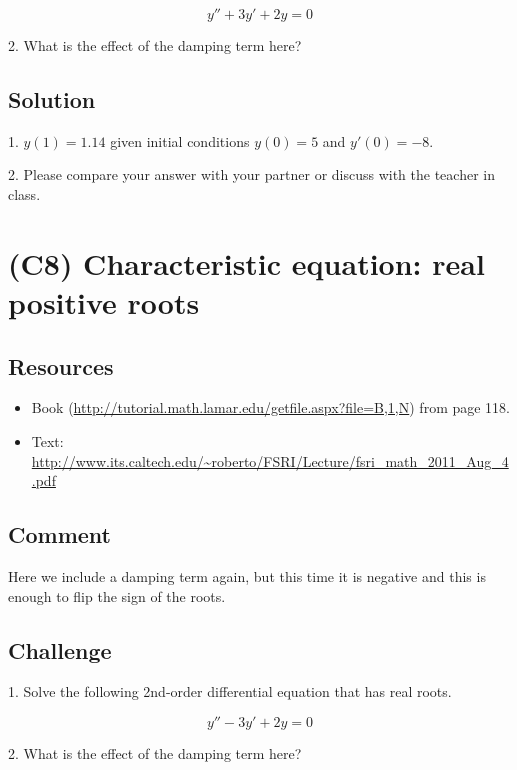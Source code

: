 \begin{equation}
    \label{eq:ccrrpb}
    y'' + 3 y' + 2 y = 0
\end{equation}

2. What is the effect of the damping term here?

\subsection*{Solution}
1. $y(1) = 1.14$ given initial conditions $y(0)=5$ and $y'(0)=-8$.

2. Please compare your answer with your partner or discuss with the teacher in class.




\newpage
\section{(C8) Characteristic equation: real positive roots}

\subsection*{Resources}
\begin{itemize}
    \item Book (\url{http://tutorial.math.lamar.edu/getfile.aspx?file=B,1,N}) from page 118.
    \item Text: \url{http://www.its.caltech.edu/~roberto/FSRI/Lecture/fsri_math_2011_Aug_4.pdf}
\end{itemize}

\subsection*{Comment}
Here we include a damping term again, but this time it is negative and this is enough to flip the sign of the roots.

\subsection*{Challenge}
1. Solve the following 2nd-order differential equation that has real roots. 

\begin{equation}
    y'' - 3 y' + 2 y = 0
\end{equation}

2. What is the effect of the damping term here?

